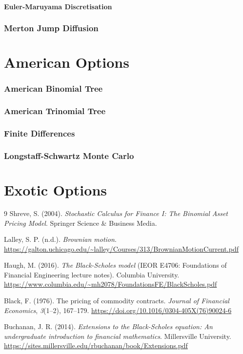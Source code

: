 \documentclass[12pt]{article}
\numberwithin{equation}{section}
\begin{document}
\subsection{Euler-Maruyama Discretisation}
\section{Merton Jump Diffusion}
\newpage

\part{American Options}
\setcounter{section}{0}
\section{American Binomial Tree}
\section{American Trinomial Tree}
\section{Finite Differences}
\section{Longstaff-Schwartz Monte Carlo}

\part {Exotic Options}
\begin{thebibliography}	{9} 
Shreve, S. (2004). \textit{Stochastic Calculus for Finance I: The Binomial Asset Pricing Model}. Springer Science \& Business Media.

Lalley, S. P. (n.d.). \textit{Brownian motion}. \url{https://galton.uchicago.edu/~lalley/Courses/313/BrownianMotionCurrent.pdf}

Haugh, M. (2016). \textit{The Black-Scholes model} (IEOR E4706: Foundations of Financial Engineering lecture notes). Columbia University. \url{https://www.columbia.edu/~mh2078/FoundationsFE/BlackScholes.pdf}

Black, F. (1976). The pricing of commodity contracts. \textit{Journal of Financial Economics}, \textit{3}(1--2), 167--179. \url{https://doi.org/10.1016/0304-405X(76)90024-6}


Buchanan, J. R. (2014). \textit{Extensions to the Black-Scholes equation: An undergraduate introduction to financial mathematics}. Millersville University. \url{https://sites.millersville.edu/rbuchanan/book/Extensions.pdf}


\end{thebibliography}
\end{document}

